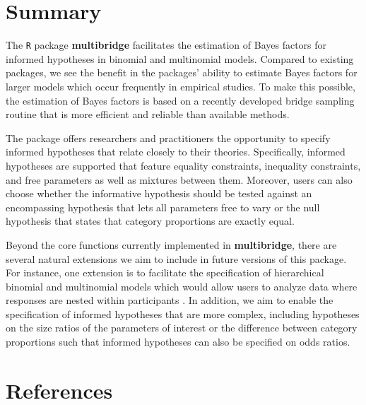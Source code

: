 \documentclass[
  english,
  man,floatsintext]{apa6}
\begin{document}
\hypertarget{summary}{%
\section{Summary}\label{summary}}

The \texttt{R} package \textbf{multibridge} facilitates the estimation of Bayes factors for informed hypotheses in binomial and multinomial models. Compared to existing packages, we see the benefit in the packages' ability to estimate Bayes factors for larger models which occur frequently in empirical studies. To make this possible, the estimation of Bayes factors is based on a recently developed bridge sampling routine that is more efficient and reliable than available methods.

The package offers researchers and practitioners the opportunity to specify informed hypotheses that relate closely to their theories. Specifically, informed hypotheses are supported that feature equality constraints, inequality constraints, and free parameters as well as mixtures between them. Moreover, users can also choose whether the informative hypothesis should be tested against an encompassing hypothesis that lets all parameters free to vary or the null hypothesis that states that category proportions are exactly equal.

Beyond the core functions currently implemented in \textbf{multibridge}, there are several natural extensions we aim to include in future versions of this package. For instance, one extension is to facilitate the specification of hierarchical binomial and multinomial models which would allow users to analyze data where responses are nested within participants . In addition, we aim to enable the specification of informed hypotheses that are more complex, including hypotheses on the size ratios of the parameters of interest or the difference between category proportions such that informed hypotheses can also be specified on odds ratios.

\clearpage

\hypertarget{references}{%
\section{References}\label{references}}

\begingroup
\setlength{\parindent}{-0.5in}
\setlength{\leftskip}{0.5in}
\end{document}
